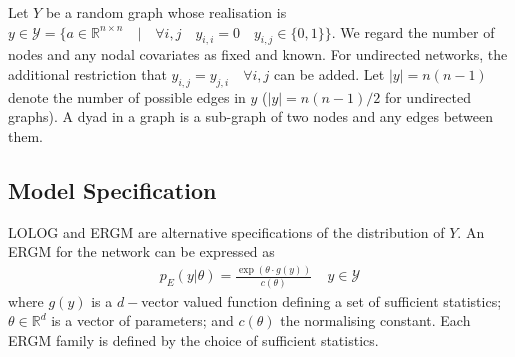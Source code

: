 \documentclass[
]{statsoc}
\begin{document}
Let \(Y\) be a random graph whose realisation is
\(y \in \mathscr{Y} = \lbrace a \in \mathbb{R}^{n \times n} \quad \vert \quad \forall i,j \quad y_{i,i} = 0 \quad y_{i,j} \in \lbrace 0,1 \rbrace\rbrace\).
We regard the number of nodes and any nodal covariates as fixed and
known. For undirected networks, the additional restriction that
\(y_{i,j} = y_{j,i} \quad\forall i,j\) can be added. Let \(|y|=n(n-1)\)
denote the number of possible edges in \(y\) (\(|y|=n(n-1)/2\) for
undirected graphs). A dyad in a graph is a sub-graph of two nodes and
any edges between them.

\subsection{Model Specification}

LOLOG and ERGM are alternative specifications of the distribution of
\(Y\). An ERGM for the network can be expressed as
\begin{align}\label{eq:ERGM_spec}
p_{E}(y\vert \theta) = \frac{\exp(\theta\cdot g(y))}{c({\theta})}~~~~~ y\in \mathscr{Y}
\end{align} \noindent where \(g(y)\) is a \(d-\)vector valued function
defining a set of sufficient statistics; \(\theta \in \mathds{R}^{d}\)
is a vector of parameters; and \(c(\theta)\) the normalising constant.
Each ERGM family is defined by the choice of sufficient statistics.
\end{document}
